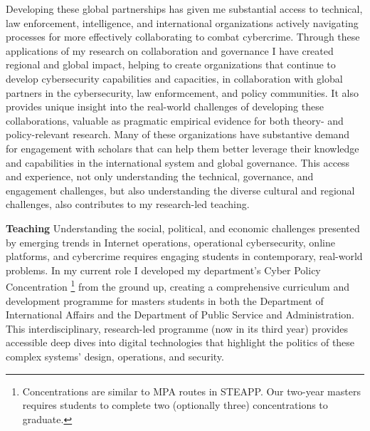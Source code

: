 \documentclass[11pt]{letter}
\begin{document}
\begin{letter}
%

Developing these global partnerships has given me substantial access to technical, law enforcement, intelligence, and international organizations actively navigating processes for more effectively collaborating to combat cybercrime.
%
Through these applications of my research on collaboration and governance I have created regional and global impact, helping to create organizations that continue to develop cybersecurity capabilities and capacities, in collaboration with global partners in the cybersecurity, law enformcement, and policy communities.
%
It also provides unique insight into the real-world challenges of developing these collaborations, valuable as pragmatic empirical evidence for both theory- and policy-relevant research.
%
%
%
%
%
Many of these organizations have substantive demand for engagement with scholars that can help them better leverage their knowledge and capabilities in the international system and global governance.
%
This access and experience, not only understanding the technical, governance, and engagement challenges, but also understanding the diverse cultural and regional challenges, also contributes to my research-led teaching.




\textbf{Teaching} \vspace{0.2 \baselineskip} \newline %
%
Understanding the social, political, and economic challenges presented by emerging trends in Internet operations, operational cybersecurity, online platforms, and cybercrime requires engaging students in contemporary, real-world problems.
%
In my current role I developed my department's Cyber Policy Concentration%
  \footnote{Concentrations are similar to MPA routes in STEAPP.  Our two-year masters requires students to complete two (optionally three) concentrations to graduate.} 
from the ground up, creating a comprehensive curriculum and development programme for masters students in both the Department of International Affairs and the Department of Public Service and Administration.
%
This interdisciplinary, research-led programme (now in its third year) provides accessible deep dives into digital technologies that highlight the politics of these complex systems' design, operations, and security.
%


\end{letter}
\end{document}
